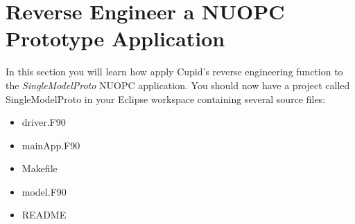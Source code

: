 \documentclass[oneside,11pt]{memoir}
\begin{document}
\section{Reverse Engineer a NUOPC Prototype Application}

In this section you will learn how apply Cupid's reverse engineering function to the \emph{SingleModelProto} NUOPC application. You should now have a project called SingleModelProto in your Eclipse workspace containing several source files:
\begin{itemize}
\item driver.F90
\item mainApp.F90
\item Makefile
\item model.F90
\item README
\end{itemize}
\end{document}
